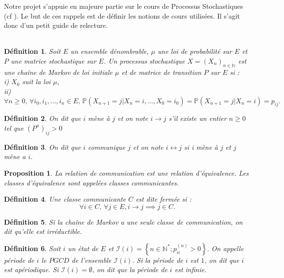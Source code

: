 \documentclass[12pt,a4paper]{report}
\newtheorem{definition}{Définition}[section]
\newtheorem{prop}[thm]{Proposition}
\theoremstyle{remark}
\begin{document}
Notre projet s'appuie en majeure partie sur le cours de Processus Stochastiques (cf \cite{cle1}). Le but de ces rappels est de définir les notions de cours utilisées. Il s'agit donc d'un petit guide de relecture.
\\
\\
\begin{definition}
Soit $E$ un ensemble dénombrable, $\mu$ une loi de probabilité sur $E$ et $P$ une matrice stochastique sur $E$. Un processus stochastique $X=(X_n)_{n \in \mathbb{N}}$ est une chaîne de Markov de loi initiale $\mu$ et de matrice de transition $P$ sur $E$ si : \\
i) $X_0$ suit la loi $\mu$, \\
ii) $\forall n \geqslant 0, \, \forall i_0, i_1, ..., i_n \in E, \, \mathbb{P}(X_{n+1}=j|X_n=i, ..., X_0=i_0) = \mathbb{P}(X_{n+1}=j|X_n=i) = p_{ij}.$
\end{definition}
\begin{definition}\label{defa}
On dit que $i$ mène à $j$ et on note $i \longrightarrow j$ s'il existe un entier $n \geq 0$ tel que $\left(P^{n}\right)_{i j}>0$
\end{definition}
\begin{definition}\label{defb}
On dit que $i$ communique $j$ et on note $i \leftrightarrow j$ si i mène à $j$ et $j$ mène a $i$.
\end{definition}
\begin{prop}
La relation de communication est une relation d'équivalence. Les classes d'équivalence sont appelées classes communicantes.
\end{prop}
\begin{definition}\label{def0}
Une classe communicante $C$ est dite fermée si :
$$\forall i \in C, \, \forall j \in E, i \rightarrow j \implies j \in C .$$
\end{definition}
\begin{definition}\label{defa0}
Si la chaîne de Markov a une seule classe de communication, on dit qu'elle est irréductible.
\end{definition}
\begin{definition}\label{def00}
Soit $i$ un état de $E$ et $\mathcal{I}(i)=\left\{n \in \mathbb{N}^{*} ; p_{i i}^{(n)}>0\right\} .$ On appelle période de $i$ le $P G C D$ de l'ensemble $\mathcal{I}(i) .$ Si la période de $i$ est $1$, on dit que $i$ est apériodique. Si $\mathcal{I}(i)=\emptyset$, on dit que la période de $i$ est infinie.
\end{definition}
\end{document}
